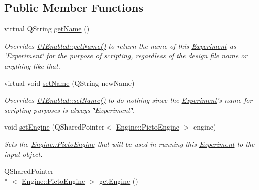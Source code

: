 \subsection*{Public Member Functions}
\begin{DoxyCompactItemize}
\item 
virtual Q\-String \hyperlink{class_picto_1_1_experiment_aaa7ef4c154cdae56f140caa7456e6342}{get\-Name} ()
\begin{DoxyCompactList}\small\item\em Overrides \hyperlink{class_picto_1_1_u_i_enabled_a98007f02abd55321577ef5db5460caba}{U\-I\-Enabled\-::get\-Name()} to return the name of this \hyperlink{class_picto_1_1_experiment}{Experiment} as \char`\"{}\-Experiment\char`\"{} for the purpose of scripting, regardless of the design file name or anything like that. \end{DoxyCompactList}\item 
virtual void \hyperlink{class_picto_1_1_experiment_a91af2b7dfc7a85d50a84605c5efa35e0}{set\-Name} (Q\-String new\-Name)
\begin{DoxyCompactList}\small\item\em Overrides \hyperlink{class_picto_1_1_u_i_enabled_a0fd1659233b0cf46ede8cbaa2c8034df}{U\-I\-Enabled\-::set\-Name()} to do nothing since the \hyperlink{class_picto_1_1_experiment}{Experiment}'s name for scripting purposes is always \char`\"{}\-Experiment\char`\"{}. \end{DoxyCompactList}\item 
void \hyperlink{class_picto_1_1_experiment_a567673ce1a500a661712458086612005}{set\-Engine} (Q\-Shared\-Pointer$<$ \hyperlink{class_picto_1_1_engine_1_1_picto_engine}{Engine\-::\-Picto\-Engine} $>$ engine)
\begin{DoxyCompactList}\small\item\em Sets the \hyperlink{class_picto_1_1_engine_1_1_picto_engine}{Engine\-::\-Picto\-Engine} that will be used in running this \hyperlink{class_picto_1_1_experiment}{Experiment} to the input object. \end{DoxyCompactList}\item 
\hypertarget{class_picto_1_1_experiment_af1f0c10174056338e9624638453029f6}{Q\-Shared\-Pointer\\*
$<$ \hyperlink{class_picto_1_1_engine_1_1_picto_engine}{Engine\-::\-Picto\-Engine} $>$ \hyperlink{class_picto_1_1_experiment_af1f0c10174056338e9624638453029f6}{get\-Engine} ()}\label{class_picto_1_1_experiment_af1f0c10174056338e9624638453029f6}


\end{DoxyCompactItemize}
